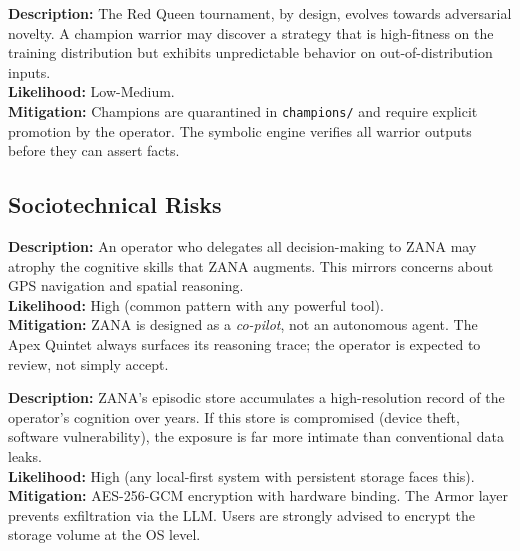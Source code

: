 \documentclass[12pt,a4paper]{article}
\begin{document}
\begin{tcolorbox}[riskbox, title={Risk T3: Evolutionary Unpredictability}]
\textbf{Description:} The Red Queen tournament, by design, evolves towards adversarial
novelty. A champion warrior may discover a strategy that is high-fitness on the training
distribution but exhibits unpredictable behavior on out-of-distribution inputs.\\
\textbf{Likelihood:} Low-Medium.\\
\textbf{Mitigation:} Champions are quarantined in \texttt{champions/} and require explicit
promotion by the operator. The symbolic engine verifies all warrior outputs before they
can assert facts.
\end{tcolorbox}

\subsection{Sociotechnical Risks}
\label{sec:risks:socio}

\begin{tcolorbox}[riskbox, title={Risk S1: Epistemic Over-Reliance}]
\textbf{Description:} An operator who delegates all decision-making to ZANA may atrophy
the cognitive skills that ZANA augments. This mirrors concerns about GPS navigation
and spatial reasoning.\\
\textbf{Likelihood:} High (common pattern with any powerful tool).\\
\textbf{Mitigation:} ZANA is designed as a \emph{co-pilot}, not an autonomous agent.
The Apex Quintet always surfaces its reasoning trace; the operator is expected to
review, not simply accept.
\end{tcolorbox}

\begin{tcolorbox}[riskbox, title={Risk S2: Privacy Breach via Episodic Leakage}]
\textbf{Description:} ZANA's episodic store accumulates a high-resolution record of
the operator's cognition over years. If this store is compromised (device theft,
software vulnerability), the exposure is far more intimate than conventional data leaks.\\
\textbf{Likelihood:} High (any local-first system with persistent storage faces this).\\
\textbf{Mitigation:} AES-256-GCM encryption with hardware binding. The Armor layer
prevents exfiltration via the LLM. Users are strongly advised to encrypt the storage
volume at the OS level.
\end{tcolorbox}
\end{document}
